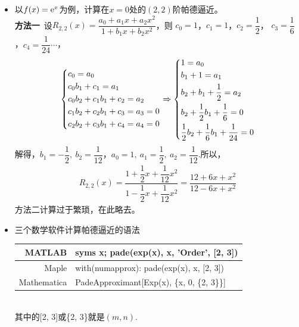 \begin{itemize}[leftmargin=\inteval{\myitemleftmargin}pt,itemsep=
   \inteval{\myitemitempsep}pt,topsep=\inteval{\myitemtopsep}pt]
\item 以$ f(x)=\mathrm{e}^x $为例，计算在$ x=0 $处的$ (2,2) $阶帕德逼近。\\
\textbf{方法一}\ 设$ R_{2,2}(x)=\dfrac{a_0+a_1x+a_2x^2}{1+b_1x+b_2x^2} $，则
$ c_0=1 $，$ c_1=1 $，$ c_2=\dfrac{1}{2} $，
$ c_3=\dfrac{1}{6} $，$ c_4=\dfrac{1}{24}\cdots $，
\begin{gather*}
    \begin{dcases}
        c_0=a_0 \\
        c_0b_1+c_1=a_1 \\
        c_0b_2+c_1b_1+c_2=a_2 \\
        c_1b_2+c_2b_1+c_3=a_3=0 \\
        c_2b_2+c_3b_1+c_4=a_4=0
    \end{dcases} \Rightarrow 
    \begin{dcases}
        1=a_0 \\
        b_1+1=a_1 \\
        b_2+b_1+\dfrac{1}{2}=a_2 \\
        b_2+\dfrac{1}{2}b_1+\dfrac{1}{6}=0 \\
        \dfrac{1}{2}b_2+\dfrac{1}{6}b_1+\dfrac{1}{24}=0
    \end{dcases}
\end{gather*}
解得，$ b_1=-\dfrac{1}{2},\ b_2=\dfrac{1}{12} $，$ a_0=1,\ 
a_1=\dfrac{1}{2},\ a_2=\dfrac{1}{12} $.所以，
\begin{gather*}
    R_{2,2}(x)=\dfrac{1+\dfrac{1}{2}x+\dfrac{1}{12}x^2}{1
        -\dfrac{1}{2}x+\dfrac{1}{12}x^2}=
    \dfrac{12+6x+x^2}{12-6x+x^2}
\end{gather*}
方法二计算过于繁琐，在此略去。

\item 三个数学软件计算帕德逼近的语法 
\begin{table}[!htbp]
\centering
\begin{tabular}{|r|l|}
    \hline
    MATLAB & syms x; pade(exp(x), x, 'Order', [2, 3]) \\ \hline
    Maple & with(numapprox): pade(exp(x), x, [2, 3]) \\ \hline
    Mathematica & PadeApproximant[Exp(x), \{x, 0, \{2, 3\}\}] \\ \hline
\end{tabular}
\end{table} \\
其中的[2, 3]或\{2, 3\}就是$ (m,n) $.


\end{itemize}
